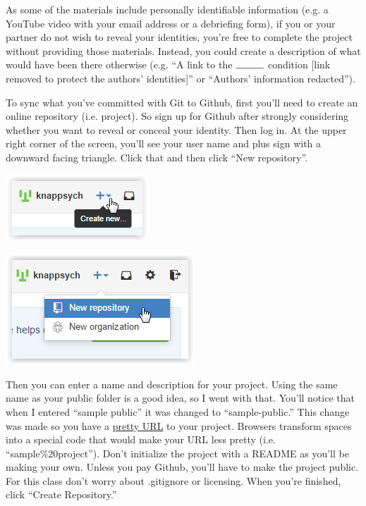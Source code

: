 \documentclass[12pt]{article}
\begin{document}
As some of the materials include personally identifiable information (e.g. a YouTube video with
your email address or a debriefing form), if you or your partner do not wish to reveal your
identities, you're free to complete the project without providing those materials. Instead, you
could create a description of what would have been there otherwise (e.g. ``A link to the
$\rule{1cm}{0.15mm}$ condition [link removed to protect the authors' identities]'' or 
``Authors' information redacted'').

To sync what you've committed with Git to Github, first you'll need to create an online repository
(i.e. project). So sign up for Github after strongly considering whether you want to reveal
or conceal your identity. Then log in. At the upper right corner of the screen, you'll see your
user name and plus sign with a downward facing triangle. Click that and then click ``New
repository''.

\includegraphics{imgs/Github01.PNG}

\includegraphics{imgs/Github02.PNG}

Then you can enter a name and description for your project. Using the same name as your public folder
is a good idea, so I went with that. You'll notice that when I entered ``sample public'' it was changed
to ``sample-public.'' This change was made so you have a \href{http://www.desiquintans.com/cleanurls}
{pretty URL} to your project. Browsers transform spaces into a special code that would make your URL
less pretty (i.e. ``sample\%20project''). Don't initialize the project with a README as you'll be making
your own. Unless you pay Github, you'll have to make the project public. For this class don't worry
about .gitignore or licensing. When you're finished, click ``Create Repository.''
\end{document}
